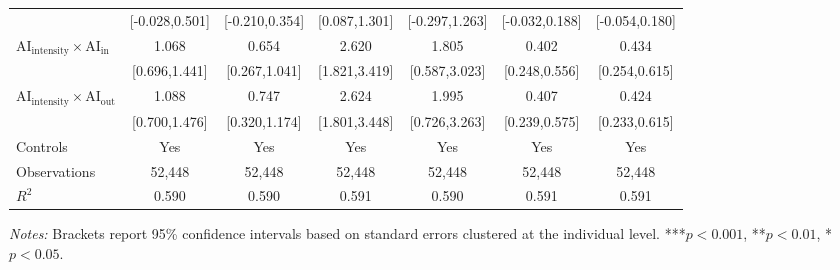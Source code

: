 \begin{table}[H]
\begin{threeparttable}
\begin{tabular}{l*{6}{c}}
            &        [-0.028,0.501]         &        [-0.210,0.354]         &         [0.087,1.301]         &        [-0.297,1.263]         &        [-0.032,0.188]         &        [-0.054,0.180]         \\
$\mathrm{AI}_{\text{intensity}} \times \mathrm{AI}_{\text{in}}$&                 1.068\sym{***}&                 0.654\sym{***}&                 2.620\sym{***}&                 1.805\sym{**} &                 0.402\sym{***}&                 0.434\sym{***}\\
            &         [0.696,1.441]         &         [0.267,1.041]         &         [1.821,3.419]         &         [0.587,3.023]         &         [0.248,0.556]         &         [0.254,0.615]         \\
$\mathrm{AI}_{\text{intensity}} \times \mathrm{AI}_{\text{out}}$&                 1.088\sym{***}&                 0.747\sym{***}&                 2.624\sym{***}&                 1.995\sym{**} &                 0.407\sym{***}&                 0.424\sym{***}\\
            &         [0.700,1.476]         &         [0.320,1.174]         &         [1.801,3.448]         &         [0.726,3.263]         &         [0.239,0.575]         &         [0.233,0.615]         \\
\midrule
Controls    &                   Yes         &                   Yes         &                   Yes         &                   Yes         &                   Yes         &                   Yes         \\
Observations&                52,448         &                52,448         &                52,448         &                52,448         &                52,448         &                52,448         \\
$R^2$       &                 0.590         &                 0.590         &                 0.591         &                 0.590         &                 0.591         &                 0.591         \\
\bottomrule\bottomrule
\end{tabular}
\begin{tablenotes}
\footnotesize
\item \textit{Notes:} Brackets report 95\% confidence intervals based on standard errors clustered at the individual level. ***$p<0.001$, **$p<0.01$, *$p<0.05$.
\end{tablenotes}
\end{threeparttable}
\end{table}
